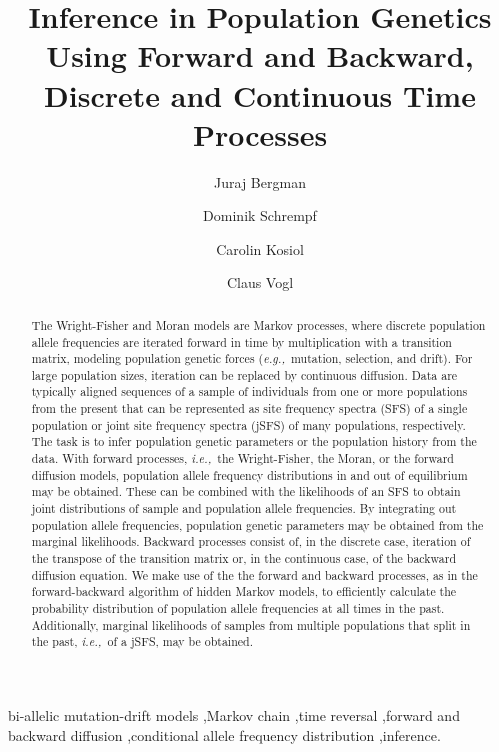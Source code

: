 \documentclass[preprint]{elsarticle}
\newcommand\eg{{\it e.g.,}}
\newcommand\ie{{\it i.e.,}}
\begin{document}
\begin{frontmatter}

\title{Inference in Population Genetics Using Forward and Backward, Discrete and Continuous Time Processes}

\author[address1,address2]{Juraj Bergman}
\author[address1,address2]{Dominik Schrempf}
\author[address1]{Carolin Kosiol}
\author[address3]{Claus Vogl}

\address[address1]{Institut f\"ur Populationsgenetik, Vetmeduni Vienna, Veterin\"arplatz 1, A-1210 Wien, Austria}
\address[address2]{Vienna Graduate School of Population Genetics, A-1210 Wien, Austria}
\address[address3]{Institut f\"ur Tierzucht und Genetik, Vetmeduni Vienna, Veterin\"arplatz 1, A-1210 Wien, Austria}

\begin{abstract}
The Wright-Fisher and Moran models are Markov processes, where discrete population allele frequencies are iterated forward in time by multiplication with a transition matrix, modeling population genetic forces (\eg\ mutation, selection, and drift). For large population sizes, iteration can be replaced by continuous diffusion. Data are typically aligned sequences of a sample of individuals from one or more populations from the present that can be represented as site frequency spectra (SFS) of a single population or joint site frequency spectra (jSFS) of many populations, respectively. The task is to infer population genetic parameters or the population history from the data. With forward processes, \ie\ the Wright-Fisher, the Moran, or the forward diffusion models, population allele frequency distributions in and out of equilibrium may be obtained. These can be combined with the likelihoods of an SFS to obtain joint distributions of sample and population allele frequencies. By integrating out population allele frequencies, population genetic parameters may be obtained from the marginal likelihoods. Backward processes consist of, in the discrete case, iteration of the transpose of the transition matrix or, in the continuous case, of the backward diffusion equation. We make use of the the forward and backward processes, as in the forward-backward algorithm of hidden Markov models, to efficiently calculate the probability distribution of population allele frequencies at all times in the past. Additionally, marginal likelihoods of samples from multiple populations that split in the past, \ie\ of a jSFS, may be obtained.
\end{abstract}
\begin{keyword}
bi-allelic mutation-drift models \sep Markov chain \sep time reversal \sep forward and backward diffusion \sep conditional allele frequency distribution \sep inference.
\end{keyword}

\end{frontmatter}
\end{document}
